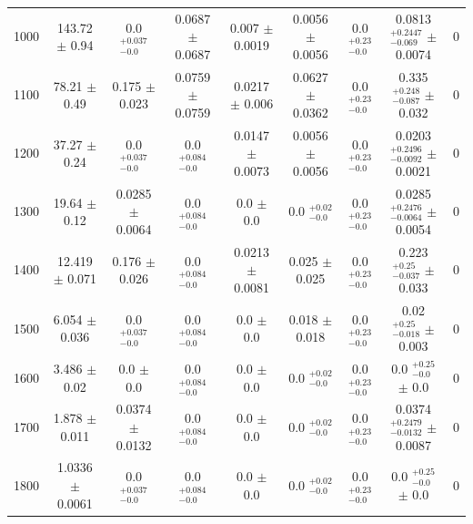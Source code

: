 \begin{table}[H]
\begin{center}
\begin{tabular}{ccccccccc}
            1000  &    	143.72 $\pm$ 0.94  &  	 0.0 $ _{-0.0}^{+0.037}$   &	 0.0687 $\pm$ 0.0687  &     	 0.007 $\pm$ 0.0019  & 	 0.0056 $\pm$ 0.0056  &         0.0 $ _{-0.0}^{+0.23}$   &      0.0813 $ _{-0.069}^{+0.2447}$   $\pm$ 0.0074  &     0 \\
            1100  &    	78.21 $\pm$ 0.49  &   	 0.175 $\pm$ 0.023  &       	 0.0759 $\pm$ 0.0759  &     	 0.0217 $\pm$ 0.006  & 	 0.0627 $\pm$ 0.0362  &         0.0 $ _{-0.0}^{+0.23}$   &      0.335 $ _{-0.087}^{+0.248}$   $\pm$ 0.032  &        0 \\
            1200  &    	37.27 $\pm$ 0.24  &   	 0.0 $ _{-0.0}^{+0.037}$   &	 0.0 $ _{-0.0}^{+0.084}$   &	 0.0147 $\pm$ 0.0073  &	 0.0056 $\pm$ 0.0056  &         0.0 $ _{-0.0}^{+0.23}$   &      0.0203 $ _{-0.0092}^{+0.2496}$   $\pm$ 0.0021  &    0 \\
            1300  &    	19.64 $\pm$ 0.12  &   	 0.0285 $\pm$ 0.0064  &     	 0.0 $ _{-0.0}^{+0.084}$   &	 0.0 $\pm$ 0.0  &      	 0.0 $ _{-0.0}^{+0.02}$   &     0.0 $ _{-0.0}^{+0.23}$   &      0.0285 $ _{-0.0064}^{+0.2476}$   $\pm$ 0.0054  &    0 \\
            1400  &    	12.419 $\pm$ 0.071  & 	 0.176 $\pm$ 0.026  &       	 0.0 $ _{-0.0}^{+0.084}$   &	 0.0213 $\pm$ 0.0081  &	 0.025 $\pm$ 0.025  &           0.0 $ _{-0.0}^{+0.23}$   &      0.223 $ _{-0.037}^{+0.25}$   $\pm$ 0.033  &         0 \\
            1500  &    	6.054 $\pm$ 0.036  &  	 0.0 $ _{-0.0}^{+0.037}$   &	 0.0 $ _{-0.0}^{+0.084}$   &	 0.0 $\pm$ 0.0  &      	 0.018 $\pm$ 0.018  &           0.0 $ _{-0.0}^{+0.23}$   &      0.02 $ _{-0.018}^{+0.25}$   $\pm$ 0.003  &          0 \\
            1600  &    	3.486 $\pm$ 0.02  &   	 0.0 $\pm$ 0.0  &           	 0.0 $ _{-0.0}^{+0.084}$   &	 0.0 $\pm$ 0.0  &      	 0.0 $ _{-0.0}^{+0.02}$   &     0.0 $ _{-0.0}^{+0.23}$   &      0.0 $ _{-0.0}^{+0.25}$   $\pm$ 0.0  &               0 \\
            1700  &    	1.878 $\pm$ 0.011  &  	 0.0374 $\pm$ 0.0132  &     	 0.0 $ _{-0.0}^{+0.084}$   &	 0.0 $\pm$ 0.0  &      	 0.0 $ _{-0.0}^{+0.02}$   &     0.0 $ _{-0.0}^{+0.23}$   &      0.0374 $ _{-0.0132}^{+0.2479}$   $\pm$ 0.0087  &    0 \\
            1800  &    	1.0336 $\pm$ 0.0061  &	 0.0 $ _{-0.0}^{+0.037}$   &	 0.0 $ _{-0.0}^{+0.084}$   &	 0.0 $\pm$ 0.0  &      	 0.0 $ _{-0.0}^{+0.02}$   &     0.0 $ _{-0.0}^{+0.23}$   &      0.0 $ _{-0.0}^{+0.25}$   $\pm$ 0.0  &               0 \\

\end{tabular}
\end{center}
\end{table}
